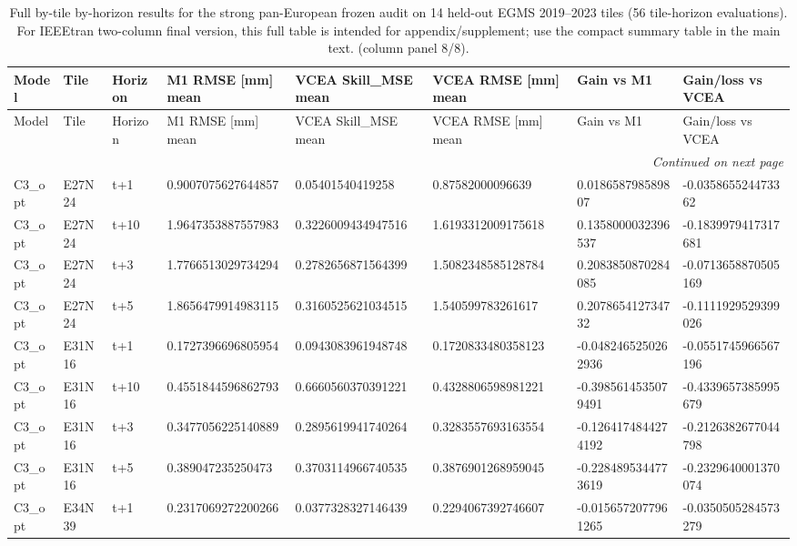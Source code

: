 \begin{landscape}
\scriptsize
\setlength{\LTleft}{0pt}
\setlength{\LTright}{0pt}
\begin{longtable}{llllllll}
\caption{Full by-tile by-horizon results for the strong pan-European frozen audit on 14 held-out EGMS 2019--2023 tiles (56 tile-horizon evaluations). For IEEEtran two-column final version, this full table is intended for appendix/supplement; use the compact summary table in the main text. (column panel 8/8).}\label{tab:e7_strong_by_tile_full_part8}\\
\toprule
Model & Tile & Horizon & M1 RMSE [mm] mean & VCEA Skill\_MSE mean & VCEA RMSE [mm] mean & Gain vs M1 & Gain/loss vs VCEA \\
\midrule
\endfirsthead
\toprule
Model & Tile & Horizon & M1 RMSE [mm] mean & VCEA Skill\_MSE mean & VCEA RMSE [mm] mean & Gain vs M1 & Gain/loss vs VCEA \\
\midrule
\endhead
\midrule
\multicolumn{8}{r}{\textit{Continued on next page}} \\
\endfoot
\bottomrule
\endlastfoot
C3\_opt & E27N24 & t+1 & 0.9007075627644857 & 0.05401540419258 & 0.87582000096639 & 0.018658798589807 & -0.035865524473362 \\
C3\_opt & E27N24 & t+10 & 1.9647353887557983 & 0.3226009434947516 & 1.6193312009175618 & 0.1358000032396537 & -0.1839979417317681 \\
C3\_opt & E27N24 & t+3 & 1.7766513029734294 & 0.2782656871564399 & 1.5082348585128784 & 0.2083850870284085 & -0.0713658870505169 \\
C3\_opt & E27N24 & t+5 & 1.8656479914983115 & 0.3160525621034515 & 1.540599783261617 & 0.207865412734732 & -0.1111929529399026 \\
C3\_opt & E31N16 & t+1 & 0.1727396696805954 & 0.0943083961948748 & 0.1720833480358123 & -0.0482465250262936 & -0.0551745966567196 \\
C3\_opt & E31N16 & t+10 & 0.4551844596862793 & 0.6660560370391221 & 0.4328806598981221 & -0.3985614535079491 & -0.4339657385995679 \\
C3\_opt & E31N16 & t+3 & 0.3477056225140889 & 0.2895619941740264 & 0.3283557693163554 & -0.1264174844274192 & -0.2126382677044798 \\
C3\_opt & E31N16 & t+5 & 0.389047235250473 & 0.3703114966740535 & 0.3876901268959045 & -0.2284895344773619 & -0.2329640001370074 \\
C3\_opt & E34N39 & t+1 & 0.2317069272200266 & 0.0377328327146439 & 0.2294067392746607 & -0.0156572077961265 & -0.0350505284573279 \\

\end{longtable}
\end{landscape}
